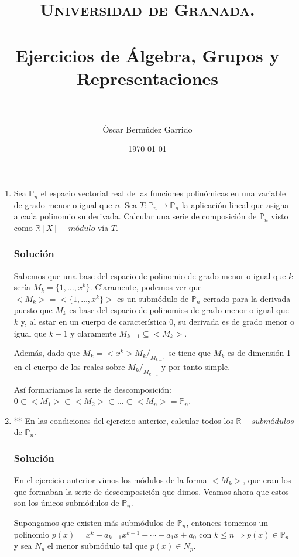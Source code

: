 \documentclass[paper=a4, fontsize=11pt, spanish]{scrartcl}
\title{
  \normalfont \normalsize 
  \textsc{Universidad de Granada.} \\ [25pt] %
  \horrule{0.5pt} \\[0.4cm] %
  \huge Ejercicios de Álgebra, Grupos y Representaciones \\ %
  \horrule{2pt} \\[0.5cm] %
}
\author{Óscar Bermúdez Garrido} %
\date{\normalsize\today} %
\begin{document}
	\maketitle %
	
	\newpage

	\begin{enumerate}
		\item Sea $\mathbb{P}_n$ el espacio vectorial real de las funciones polinómicas en una variable de grado
		menor o igual que $n$. Sea $T: \mathbb{P}_n \rightarrow \mathbb{P}_n$ la aplicación lineal que asigna a
		cada polinomio su derivada. Calcular una serie de composición de $\mathbb{P}_n$ visto como $\mathbb{R}[X]
		-módulo$ vía $T$.
		\subsubsection*{Solución}
		Sabemos que una base del espacio de polinomio de grado menor o igual que $k$ sería $M_k = \{1, \dots, x^k\}$.
		Claramente, podemos ver que $<M_k> = <\{1, \dots, x^k\}>$ es un submódulo de $\mathbb{P}_n$ cerrado para
		la derivada puesto que $M_k$ es base del espacio de polinomios de grado menor o igual que $k$ y, al estar
		en un cuerpo de característica 0, su derivada es de grado menor o igual que $k-1$ y claramente $M_{k-1}
		\subseteq <M_k>$.
		
		Además, dado que $M_k = <x^k> M_k/_{M_{k-1}}$ se tiene que $M_k$ es de dimensión 1 en el cuerpo de los
		reales sobre $M_k/_{M_{k-1}}$ y por tanto simple.
		
		Así formaríamos la serie de descomposición: $0 \subset <M_1> \subset <M_2> \subset \dots \subset <M_n> =
		\mathbb{P}_n$.
		
		\item ** En las condiciones del ejercicio anterior, calcular todos los $\mathbb{R}-submódulos$ de
		$\mathbb{P}_n$.
		\subsubsection*{Solución}
		En el ejercicio anterior vimos los módulos de la forma $<M_k>$, que eran los que formaban la serie de
		descomposición que dimos. Veamos ahora que estos son los únicos submódulos de $\mathbb{P}_n$.
		
		Supongamos que existen más submódulos de $\mathbb{P}_n$, entonces tomemos un polinomio $p(x) = x^k +
		a_{k-1}x^{k-1} + \cdots + a_1x+a_0$ con $k \leq n \Rightarrow p(x) \in \mathbb{P}_n$ y sea $N_p$ el menor
		submódulo tal que $p(x) \in N_p$.
		

\end{enumerate}
\end{document}
